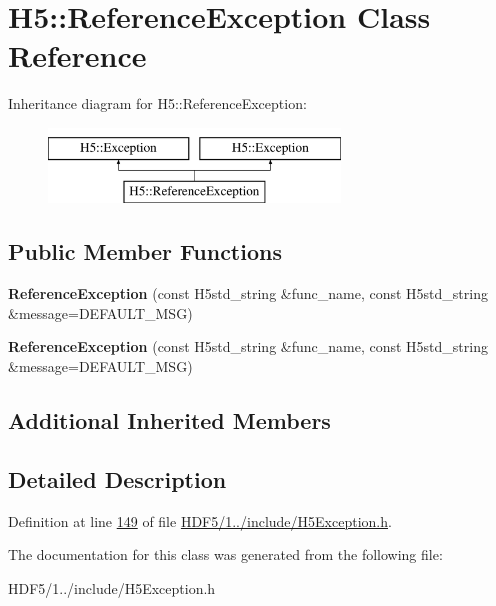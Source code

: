 \hypertarget{class_h5_1_1_reference_exception}{}\section{H5\+:\+:Reference\+Exception Class Reference}
\label{class_h5_1_1_reference_exception}
Inheritance diagram for H5\+:\+:Reference\+Exception\+:\begin{figure}[H]
\begin{center}
\leavevmode
\includegraphics[height=2.000000cm]{class_h5_1_1_reference_exception}
\end{center}
\end{figure}
\subsection*{Public Member Functions}
\begin{DoxyCompactItemize}
\item 
\mbox{\label{class_h5_1_1_reference_exception_aec65aa1682162a38da2b4f79fc9c9e5a}} 
{\bfseries Reference\+Exception} (const H5std\+\_\+string \&func\+\_\+name, const H5std\+\_\+string \&message=D\+E\+F\+A\+U\+L\+T\+\_\+\+M\+SG)
\item 
\mbox{\label{class_h5_1_1_reference_exception_aec65aa1682162a38da2b4f79fc9c9e5a}} 
{\bfseries Reference\+Exception} (const H5std\+\_\+string \&func\+\_\+name, const H5std\+\_\+string \&message=D\+E\+F\+A\+U\+L\+T\+\_\+\+M\+SG)
\end{DoxyCompactItemize}
\subsection*{Additional Inherited Members}


\subsection{Detailed Description}


Definition at line \hyperlink{_h_d_f5_21_810_81_2include_2_h5_exception_8h_source_l00149}{149} of file \hyperlink{_h_d_f5_21_810_81_2include_2_h5_exception_8h_source}{H\+D\+F5/1../include/\+H5\+Exception.\+h}.



The documentation for this class was generated from the following file\+:\begin{DoxyCompactItemize}
\item 
H\+D\+F5/1../include/\+H5\+Exception.\+h\end{DoxyCompactItemize}
